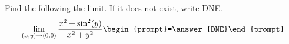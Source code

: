 \documentclass{ximera}
\author{David Guichard \and Neal Koblitz \and H. Jerome Keisler \and Albert Scheller \and Barry Balof \and Mike Wills \and Matthew Carr}
\begin{document}
\begin{exercise}




Find the following the limit. If it does not exist, write DNE. 
\[
\lim_{(x,y)\to (0,0)}\frac{x^2+\sin^{2}(y)}{x^2+y^2}\begin{prompt}=\answer{DNE}\end{prompt}
\]

\end{exercise}
\end{document}
